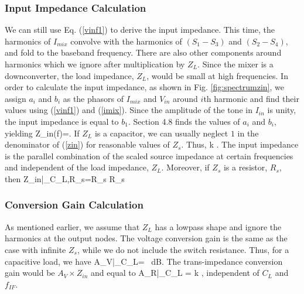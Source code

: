 \subsubsection{Input Impedance Calculation} 
We can still use Eq. (\ref{vinf1}) to derive the input impedance. This time, the harmonics of $I_{mix}$ convolve with the harmonics of
$(S_1-S_3)$ and $(S_2-S_4)$, and fold to the baseband frequency. There are also other components around harmonics which we ignore after multiplication
by $Z_L$. Since the mixer is a downconverter, the load impedance, $Z_L$, would be small at high frequencies. In order to calculate the input
impedance, as shown in Fig. \ref{fig:spectrumzin}, we assign $a_i$ and $b_i$ as the phasors of $I_{mix}$ and $V_{in}$ around $i$th harmonic and find their
values using (\ref{vinf1}) and (\ref{imix}). Since the amplitude of the tone in $I_{in}$ is unity, the input impedance is equal to $b_1$. Section 4.8
finds the values of $a_i$ and $b_i$, yielding
\beq
Z_{in}(f)=.
\label{zin}
\eeq
If $Z_L$ is a capacitor, we can usually neglect $1$ in the denominator of (\ref{zin}) for reasonable values of $Z_s$. Thus,
\beq
{} \approx \SumAll k .
\label{zinc}
\eeq
The input impedance is the parallel combination of the scaled source impedance at certain frequencies and independent of the load impedance, $Z_L$.
Moreover, if $Z_s$ is a resistor, $R_s$, then 
\beq
Z_{in}|_{C_L,R_s}=R_s  R_s
\label{zincr}
\eeq


\subsubsection{Conversion Gain Calculation}
As mentioned earlier, we assume that $Z_L$ has a lowpass shape and ignore the harmonics at the output nodes.
The voltage conversion gain is the same as the case with infinite $Z_s$, while we do not include the switch resistance. Thus, for a capacitive load,
we have
\beq
A_V|_{C_L}=  ~{dB}.
\label{avinc}
\eeq
The trans-impedance conversion gain would be $A_V \times Z_{in}$ and equal to
\beq
A_R|_{C_L} =  \div \SumAll k ,
\label{arinc}
\eeq
independent of $C_L$ and $f_{IF}$.


